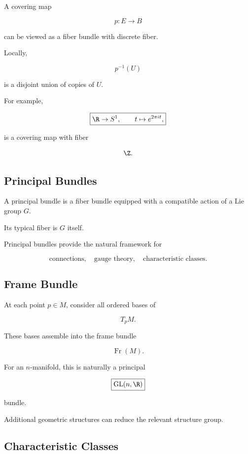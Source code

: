 A covering map

\[
p:E\to B
\]

can be viewed as a fiber bundle with discrete fiber.

Locally,

\[
\boxed{
p^{-1}(U)
}
\]

is a disjoint union of copies of \(U\).

For example,

\[
\boxed{
\R\to S^1,
\qquad
t\mapsto e^{2\pi i t},
}
\]

is a covering map with fiber

\[
\Z.
\]

\subsection{Principal Bundles}
\label{subsec:principal-bundles}

A principal bundle is a fiber bundle equipped with a compatible action of a
Lie group \(G\).

Its typical fiber is \(G\) itself.

Principal bundles provide the natural framework for

\[
\boxed{
\text{connections},
\quad
\text{gauge theory},
\quad
\text{characteristic classes}.
}
\]

\subsection{Frame Bundle}
\label{subsec:frame-bundle}

At each point \(p\in M\), consider all ordered bases of

\[
T_pM.
\]

These bases assemble into the frame bundle

\[
\boxed{
\operatorname{Fr}(M).
}
\]

For an \(n\)-manifold, this is naturally a principal

\[
\boxed{
\mathrm{GL}(n,\R)
}
\]

bundle.

Additional geometric structures can reduce the relevant structure group.

\subsection{Characteristic Classes}
\label{subsec:characteristic-classes-manifolds}

